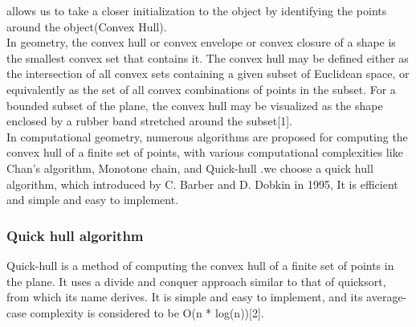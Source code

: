 allows us to take a closer initialization to the object by identifying the points around
the object(Convex Hull).\\
In geometry, the convex hull or convex envelope or convex closure of a shape is the
smallest convex set that contains it. The convex hull may be defined either as the
intersection of all convex sets containing a given subset of Euclidean space, or
equivalently as the set of all convex combinations of points in the subset. For
a bounded subset of the plane, the convex hull may be visualized as the shape
enclosed by a rubber band stretched around the subset[1].\\
In computational geometry, numerous algorithms are proposed for computing
the convex hull of a finite set of points, with various computational complexities
like Chan's algorithm, Monotone chain, and Quick-hull .we choose a quick hull
algorithm, which introduced by C. Barber and D. Dobkin in 1995, It is efficient and
simple and easy to implement.
\subsubsection{Quick hull algorithm}
Quick-hull is a method of computing the convex hull of a finite set of points in the
plane. It uses a divide and conquer approach similar to that of quicksort, from which
its name derives. It is simple and easy to implement, and its average-case complexity
is considered to be O(n * log(n))[2].
